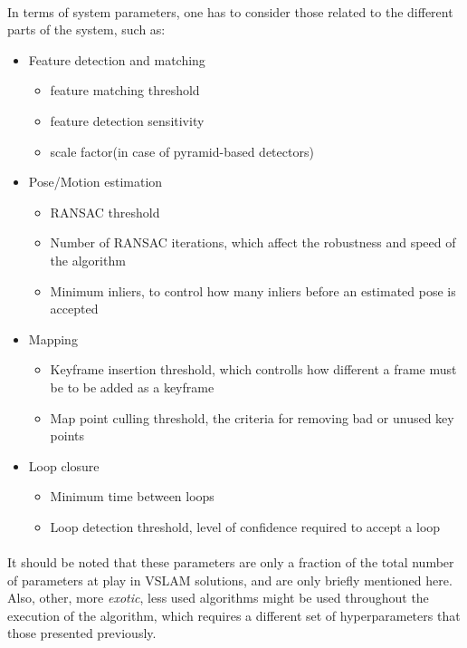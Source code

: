 \paragraph{}In terms of system parameters, one has to consider those related to the different parts of the system, such as:
\begin{itemize}
        \item Feature detection and matching 
            \begin{itemize}
                \item feature matching threshold
                \item feature detection sensitivity
                \item scale factor(in case of pyramid-based detectors)
            \end{itemize}
        \item Pose/Motion estimation
            \begin{itemize}
                \item RANSAC threshold
                \item Number of RANSAC iterations, which affect the robustness and speed of the algorithm
                \item Minimum inliers, to control how many inliers before an estimated pose is accepted
            \end{itemize}
        \item Mapping
            \begin{itemize}
                \item Keyframe insertion threshold, which controlls how different a frame must be to be added as a keyframe
                \item Map point culling threshold, the criteria for removing bad or unused key points
            \end{itemize}
        \item Loop closure
            \begin{itemize}
                \item Minimum time between loops
                \item Loop detection threshold, level of confidence required to accept a loop
            \end{itemize}
\end{itemize}
\paragraph{}It should be noted that these parameters are only a fraction of the total number of parameters at play in VSLAM solutions, and are only briefly mentioned here. Also, other, more \textit{exotic}, less used algorithms might be used throughout the execution of the algorithm, which requires a different set of hyperparameters that those presented previously.

